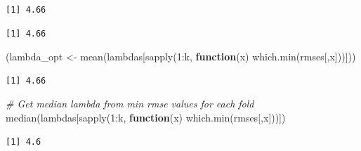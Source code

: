 \documentclass[
]{article}
\newenvironment{Shaded}{}{}
\newcommand{\CommentTok}[1]{\textcolor[rgb]{0.38,0.63,0.69}{\textit{#1}}}
\newcommand{\ControlFlowTok}[1]{\textcolor[rgb]{0.00,0.44,0.13}{\textbf{#1}}}
\newcommand{\DecValTok}[1]{\textcolor[rgb]{0.25,0.63,0.44}{#1}}
\newcommand{\FunctionTok}[1]{\textcolor[rgb]{0.02,0.16,0.49}{#1}}
\newcommand{\NormalTok}[1]{#1}
\newcommand{\OtherTok}[1]{\textcolor[rgb]{0.00,0.44,0.13}{#1}}
\newcommand{\SpecialCharTok}[1]{\textcolor[rgb]{0.25,0.44,0.63}{#1}}
\begin{document}
\begin{verbatim}
[1] 4.66
\end{verbatim}

\begin{Shaded}
\end{Shaded}

\begin{verbatim}
[1] 4.66
\end{verbatim}

\begin{Shaded}
\begin{Highlighting}[]
\NormalTok{(lambda\_opt }\OtherTok{\textless{}{-}} \FunctionTok{mean}\NormalTok{(lambdas[}\FunctionTok{sapply}\NormalTok{(}\DecValTok{1}\SpecialCharTok{:}\NormalTok{k, }\ControlFlowTok{function}\NormalTok{(x) }\FunctionTok{which.min}\NormalTok{(rmses[,x]))]))}
\end{Highlighting}
\end{Shaded}

\begin{verbatim}
[1] 4.66
\end{verbatim}

\begin{Shaded}
\begin{Highlighting}[]
\CommentTok{\# Get median lambda from min rmse values for each fold}
\FunctionTok{median}\NormalTok{(lambdas[}\FunctionTok{sapply}\NormalTok{(}\DecValTok{1}\SpecialCharTok{:}\NormalTok{k, }\ControlFlowTok{function}\NormalTok{(x) }\FunctionTok{which.min}\NormalTok{(rmses[,x]))])}
\end{Highlighting}
\end{Shaded}

\begin{verbatim}
[1] 4.6
\end{verbatim}

\begin{Shaded}
\end{Shaded}
\end{document}
